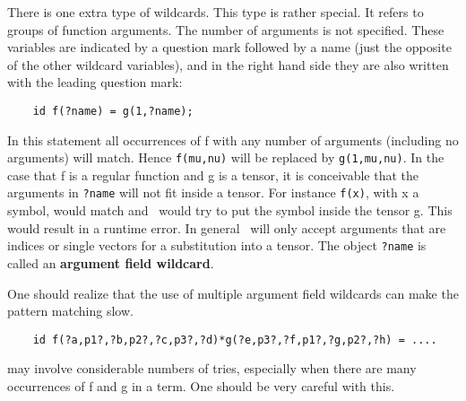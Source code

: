 There is one extra type of wildcards. This type is rather special. It 
refers to groups of function
arguments. 
The number of arguments is not specified. These variables are indicated by 
a question mark followed by a name (just the opposite of the other wildcard 
variables), and in the right hand side they are also written with the 
leading question mark:
\begin{verbatim}
    id f(?name) = g(1,?name);
\end{verbatim}
In this statement all occurrences of f with any number of 
arguments (including no arguments) will match. Hence \verb:f(mu,nu): will 
be replaced by \verb:g(1,mu,nu):. In the case that f is a regular function 
and g is a tensor, it is conceivable that the arguments in \verb:?name: 
will not fit inside a tensor. For instance \verb:f(x):, with x a symbol, 
would match and \FORM\ would try to put the symbol inside the tensor g. This 
would result in a runtime error. In general \FORM\ will only accept arguments 
that are indices or single vectors for a substitution into a tensor. The 
object \verb:?name: is called an {\bf argument field wildcard}.

One should realize that the use of multiple argument field wildcards can 
make the pattern matching slow.
\begin{verbatim}
    id f(?a,p1?,?b,p2?,?c,p3?,?d)*g(?e,p3?,?f,p1?,?g,p2?,?h) = ....
\end{verbatim}
may involve considerable numbers of tries, especially when there are many 
occurrences of f and g in a term. One should be very careful with this.
 
